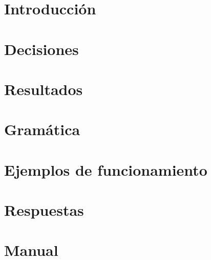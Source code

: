 \documentclass[11pt, a4paper]{article}
\begin{document}


\maketitle
\newpage

\section{Introducción}


\section{Decisiones}


\section{Resultados}


\section{Gramática}


\section{Ejemplos de funcionamiento}


\section{Respuestas}


\section{Manual}

\end{document}
